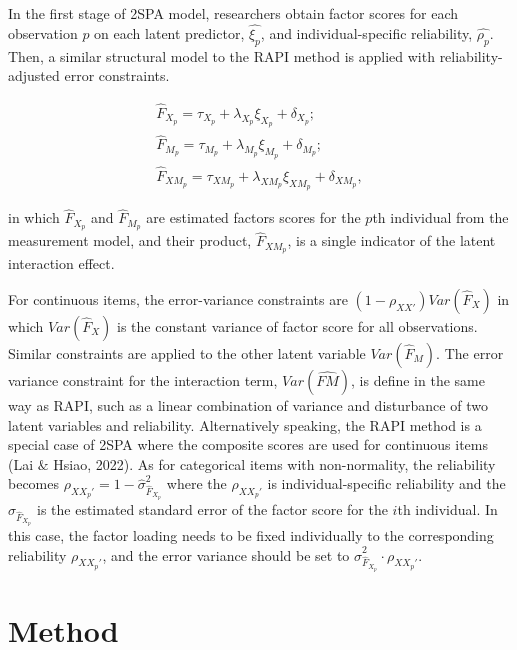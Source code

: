 \documentclass[
  man]{apa7}
\begin{document}
In the first stage of 2SPA model, researchers obtain factor scores for each observation \(p\) on each latent predictor, \(\widehat{\xi_{p}}\), and individual-specific reliability, \(\widehat{\rho_{p}}\). Then, a similar structural model to the RAPI method is applied with reliability-adjusted error constraints.

\begin{equation}
\begin{gathered}
  \widehat{F}_{X_{p}} = \tau_{X_{p}} + \lambda_{X_{p}}\xi_{X_{p}} + \delta_{X_{p}};\\
  \widehat{F}_{M_{p}} = \tau_{M_{p}} + \lambda_{M_{p}}\xi_{M_{p}} + \delta_{M_{p}};\\
  \widehat{F}_{XM_{p}} = \tau_{XM_{p}} + \lambda_{XM_{p}}\xi_{XM_{p}} + \delta_{XM_{p}},
\end{gathered}
\end{equation}

in which \(\widehat{F}_{X_{p}}\) and \(\widehat{F}_{M_{p}}\) are estimated factors scores for the \(p\)th individual from the measurement model, and their product, \(\widehat{F}_{XM_{p}}\), is a single indicator of the latent interaction effect.

For continuous items, the error-variance constraints are \((1 - \rho_{XX'})Var(\widehat{F}_{X})\) in which \(Var(\widehat{F}_{X})\) is the constant variance of factor score for all observations. Similar constraints are applied to the other latent variable \(Var(\widehat{F}_{M})\). The error variance constraint for the interaction term, \(Var(\widehat{FM})\), is define in the same way as RAPI, such as a linear combination of variance and disturbance of two latent variables and reliability. Alternatively speaking, the RAPI method is a special case of 2SPA where the composite scores are used for continuous items (Lai \(\&\) Hsiao, 2022). As for categorical items with non-normality, the reliability becomes \(\rho_{XX_{p}'} = 1 - \widehat{\sigma}_{\widehat{F}_{X_{p}}}^2\) where the \(\rho_{XX_{p}'}\) is individual-specific reliability and the \(\widehat{\sigma}_{\widehat{F}_{X_{p}}}\) is the estimated standard error of the factor score for the \(i\)th individual. In this case, the factor loading needs to be fixed individually to the corresponding reliability \(\rho_{XX_{p}'}\), and the error variance should be set to \(\widehat{\sigma}_{\widehat{F}_{X_{p}}}^2 \cdot \rho_{XX_{p}'}\).

\hypertarget{method}{%
\section{Method}\label{method}}
\end{document}
